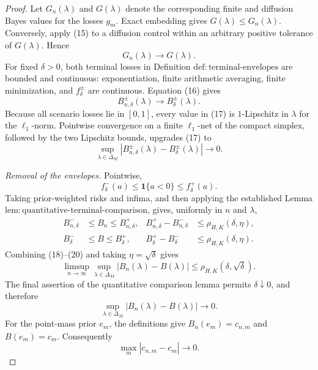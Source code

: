 \documentclass{article}
\begin{document}
\begin{proof}
Let \(G_n(\lambda)\) and \(G(\lambda)\) denote the corresponding finite and diffusion Bayes values for the losses \(g_m\).  Exact embedding gives \(G(\lambda)\leq G_n(\lambda)\).  Conversely, apply (15) to a diffusion control within an arbitrary positive tolerance of \(G(\lambda)\).  Hence
\[
 G_n(\lambda)\longrightarrow G(\lambda).                        \tag{16}
\]
For fixed \(\delta>0\), both terminal losses in Definition \(\mathrm{def{:}terminal\text{-}envelopes}\) are bounded and continuous: exponentiation, finite arithmetic averaging, finite minimization, and \(f_\delta^\pm\) are continuous.  Equation (16) gives
\[
 B_{n,\delta}^{\pm}(\lambda)\longrightarrow B_\delta^{\pm}(\lambda). \tag{17}
\]
Because all scenario losses lie in \([0,1]\), every value in (17) is \(1\)-Lipschitz in \(\lambda\) for the \(\ell_1\)-norm.  Pointwise convergence on a finite \(\ell_1\)-net of the compact simplex, followed by the two Lipschitz bounds, upgrades (17) to
\[
 \sup_{\lambda\in\Delta_M}
 |B_{n,\delta}^{\pm}(\lambda)-B_\delta^{\pm}(\lambda)|
 \longrightarrow0.                                               \tag{18}
\]

\emph{Removal of the envelopes.}  Pointwise,
\[
 f_\delta^-(a)\leq\mathbf 1\{a<0\}\leq f_\delta^+(a).          \tag{19}
\]
Taking prior-weighted risks and infima, and then applying the established Lemma \(\mathrm{lem{:}quantitative\text{-}terminal\text{-}comparison}\), gives, uniformly in \(n\) and \(\lambda\),
\[
 \begin{aligned}
 B_{n,\delta}^-&\leq B_n\leq B_{n,\delta}^+,
 &B_{n,\delta}^+-B_{n,\delta}^-&\leq\rho_{H,K}(\delta,\eta),\\
 B_\delta^-&\leq B\leq B_\delta^+,
 &B_\delta^+-B_\delta^-&\leq\rho_{H,K}(\delta,\eta).
 \end{aligned}                                                     \tag{20}
\]
Combining (18)--(20) and taking \(\eta=\sqrt\delta\) gives
\[
 \limsup_{n\to\infty}\sup_{\lambda\in\Delta_M}|B_n(\lambda)-B(\lambda)|
 \leq\rho_{H,K}(\delta,\sqrt\delta).                            \tag{21}
\]
The final assertion of the quantitative comparison lemma permits \(\delta\downarrow0\), and therefore
\[
 \sup_{\lambda\in\Delta_M}|B_n(\lambda)-B(\lambda)|\longrightarrow0. \tag{22}
\]
For the point-mass prior \(e_m\), the definitions give \(B_n(e_m)=c_{n,m}\) and \(B(e_m)=c_m\).  Consequently
\[
 \max_m|c_{n,m}-c_m|\longrightarrow0.                            \tag{23}
\]


\end{proof}
\end{document}
